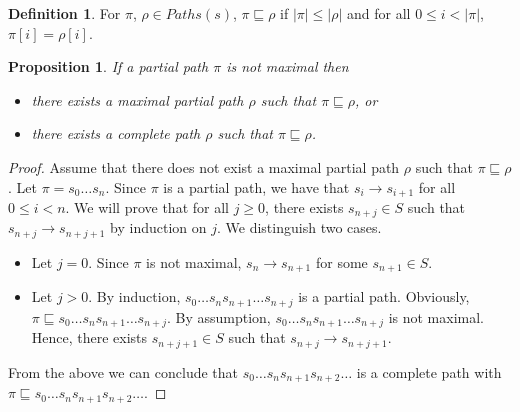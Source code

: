 \documentclass[12pt]{article}
\newtheorem{proposition}{Proposition}
\theoremstyle{definition}
\newtheorem{definition}{Definition}
\newenvironment{franck}{\color{red}}{\color{black}}
\begin{document}
\begin{franck}
\begin{definition}
For $\pi$, $\rho \in \mathit{Paths}(s)$, $\pi \sqsubseteq \rho$ if  $|\pi| \leq |\rho|$ and for all $0 \leq i < |\pi|$, $\pi[i] = \rho[i]$.
\end{definition}

\begin{proposition}
\label{proposition:partial-path-extension}
If a partial path $\pi$ is not maximal then
\begin{itemize}
\item 
there exists a maximal partial path $\rho$ such that $\pi \sqsubseteq \rho$, or
\item
there exists a complete path $\rho$ such that $\pi \sqsubseteq \rho$.
\end{itemize}
\end{proposition}
\begin{proof}
Assume that there does not exist a maximal partial path $\rho$ such that $\pi \sqsubseteq \rho$.  Let $\pi = s_0 \ldots s_n$.  Since $\pi$ is a partial path, we have that $s_i \rightarrow s_{i+1}$ for all $0 \leq i < n$.  We will prove that for all $j \geq 0$, there exists $s_{n+j} \in S$ such that $s_{n+j} \rightarrow s_{n+j+1}$ by induction on $j$.  We distinguish two cases.
\begin{itemize}
\item 
Let $j=0$.  Since $\pi$ is not maximal, $s_n \rightarrow s_{n+1}$ for some $s_{n+1} \in S$.
\item
Let $j > 0$.  By induction, $s_0 \ldots s_n s_{n+1} \ldots s_{n+j}$ is a partial path.  Obviously, $\pi \sqsubseteq s_0 \ldots s_n s_{n+1} \ldots s_{n+j}$.  By assumption, $s_0 \ldots s_n s_{n+1} \ldots s_{n+j}$ is not maximal.  Hence, there exists $s_{n+j+1} \in S$ such that $s_{n+j} \rightarrow s_{n+j+1}$.
\end{itemize}
From the above we can conclude that $s_0 \ldots s_n s_{n+1} s_{n+2} \ldots$ is a complete path with $\pi \sqsubseteq s_0 \ldots s_n s_{n+1} s_{n+2} \ldots$.
\end{proof}


\end{franck}
\end{document}
